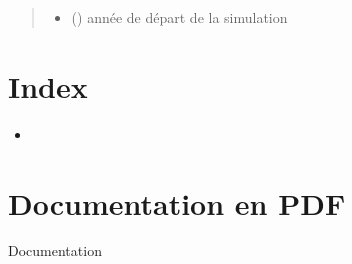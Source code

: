 \documentclass[letterpaper,10pt,french]{sphinxmanual}
\begin{document}
\begin{fulllineitems}
\begin{fulllineitems}
\begin{quote}
\begin{description}
\begin{itemize}
\item {} 
 () \textendash{} année de départ de la simulation

\end{itemize}

\end{description}\end{quote}

\end{fulllineitems}


\end{fulllineitems}



\chapter{Index}
\label{\detokenize{index:index}}\begin{itemize}
\item {} 

\end{itemize}


\chapter{Documentation en PDF}
\label{\detokenize{index:documentation-en-pdf}}
Documentation 


\renewcommand{\indexname}{Index des modules Python}
\begin{sphinxtheindex}
\let\bigletter\sphinxstyleindexlettergroup
\bigletter{s}
\item\relax{}
\end{sphinxtheindex}

\renewcommand{\indexname}{Index}
\printindex
\end{document}
